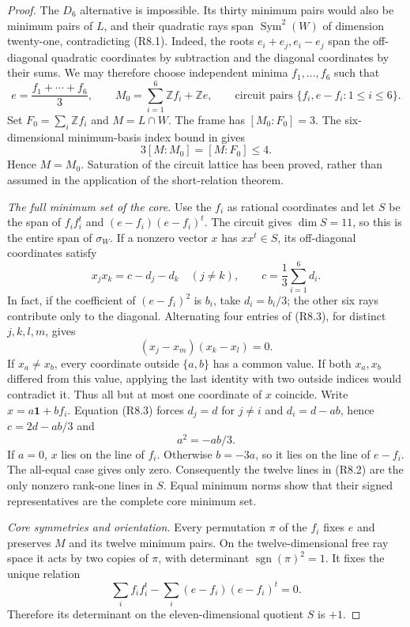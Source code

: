 \documentclass[11pt,a4paper]{article}
\theoremstyle{definition}
\begin{document}
\begin{proof}
The $D_6$ alternative is impossible. Its thirty minimum pairs would
also be minimum pairs of $L$, and their quadratic rays span
$\operatorname{Sym}^2(W)$ of dimension twenty-one, contradicting
(R8.1). Indeed, the roots $e_i+e_j,e_i-e_j$ span the off-diagonal
quadratic coordinates by subtraction and the diagonal coordinates
by their sums. We may therefore choose independent minima
$f_1,\ldots,f_6$ such that
\[
 e=\frac{f_1+\cdots+f_6}{3},\qquad
 M_0=\sum_{i=1}^6\mathbb Zf_i+\mathbb Ze,
 \qquad
 \text{circuit pairs }\{f_i,e-f_i:1\leq i\leq6\}.        \tag{R8.2}
\]
Set $F_0=\sum_i\mathbb Zf_i$ and $M=L\cap W$. The frame has
$[M_0:F_0]=3$. The six-dimensional minimum-basis index bound in
\cite[Theorem~5.2]{MartinetIndex2001} gives
\[
                   3[M:M_0]=[M:F_0]\leq4.
\]
Hence $M=M_0$. Saturation of the circuit lattice has been proved,
rather than assumed in the application of the short-relation theorem.

\medskip\noindent
\emph{The full minimum set of the core.}
Use the $f_i$ as rational coordinates and let $S$ be the span of
$f_if_i^t$ and $(e-f_i)(e-f_i)^t$. The circuit gives $\dim S=11$,
so this is the entire span of $\sigma_W$. If a nonzero vector $x$
has $xx^t\in S$, its off-diagonal coordinates satisfy
\[
 x_jx_k=c-d_j-d_k\quad(j\ne k),
 \qquad c=\frac13\sum_{i=1}^6d_i.                       \tag{R8.3}
\]
In fact, if the coefficient of $(e-f_i)^2$ is $b_i$, take
$d_i=b_i/3$; the other six rays contribute only to the diagonal.
Alternating four entries of (R8.3), for distinct $j,k,l,m$, gives
\[
                       (x_j-x_m)(x_k-x_l)=0.
\]
If $x_a\ne x_b$, every coordinate outside $\{a,b\}$ has a common
value. If both $x_a,x_b$ differed from this value, applying the last
identity with two outside indices would contradict it. Thus all but
at most one coordinate of $x$ coincide. Write $x=a\mathbf1+bf_i$.
Equation (R8.3) forces $d_j=d$ for $j\ne i$ and $d_i=d-ab$, hence
$c=2d-ab/3$ and
\[
                         a^2=-ab/3.
\]
If $a=0$, $x$ lies on the line of $f_i$. Otherwise $b=-3a$,
so it lies on the line of $e-f_i$. The all-equal case gives only
zero. Consequently the twelve lines in (R8.2) are the only nonzero
rank-one lines in $S$. Equal minimum norms show that their signed
representatives are the complete core minimum set.

\medskip\noindent
\emph{Core symmetries and orientation.}
Every permutation $\pi$ of the $f_i$ fixes $e$ and preserves $M$
and its twelve minimum pairs. On the twelve-dimensional free ray
space it acts by two copies of $\pi$, with determinant
$\operatorname{sgn}(\pi)^2=1$. It fixes the unique relation
\[
             \sum_i f_if_i^t-\sum_i(e-f_i)(e-f_i)^t=0.   \tag{R8.4}
\]
Therefore its determinant on the eleven-dimensional quotient $S$
is $+1$.


\end{proof}
\end{document}
